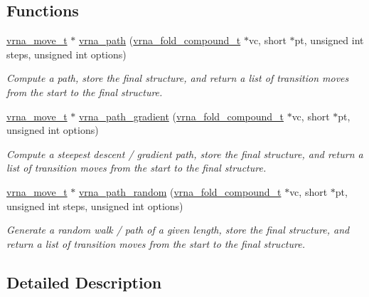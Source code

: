 \subsection*{Functions}
\begin{DoxyCompactItemize}
\item 
\hyperlink{group__neighbors_structvrna__move__s}{vrna\+\_\+move\+\_\+t} $\ast$ \hyperlink{group__paths_ga327c96463d698e7863508499cacce9ab}{vrna\+\_\+path} (\hyperlink{group__fold__compound_ga1b0cef17fd40466cef5968eaeeff6166}{vrna\+\_\+fold\+\_\+compound\+\_\+t} $\ast$vc, short $\ast$pt, unsigned int steps, unsigned int options)
\begin{DoxyCompactList}\small\item\em Compute a path, store the final structure, and return a list of transition moves from the start to the final structure. \end{DoxyCompactList}\item 
\hyperlink{group__neighbors_structvrna__move__s}{vrna\+\_\+move\+\_\+t} $\ast$ \hyperlink{group__paths_gafa18d5153ee540ddd9b93aba59d26184}{vrna\+\_\+path\+\_\+gradient} (\hyperlink{group__fold__compound_ga1b0cef17fd40466cef5968eaeeff6166}{vrna\+\_\+fold\+\_\+compound\+\_\+t} $\ast$vc, short $\ast$pt, unsigned int options)
\begin{DoxyCompactList}\small\item\em Compute a steepest descent / gradient path, store the final structure, and return a list of transition moves from the start to the final structure. \end{DoxyCompactList}\item 
\hyperlink{group__neighbors_structvrna__move__s}{vrna\+\_\+move\+\_\+t} $\ast$ \hyperlink{group__paths_ga49cfe462288be44e0dd88c96da79acbf}{vrna\+\_\+path\+\_\+random} (\hyperlink{group__fold__compound_ga1b0cef17fd40466cef5968eaeeff6166}{vrna\+\_\+fold\+\_\+compound\+\_\+t} $\ast$vc, short $\ast$pt, unsigned int steps, unsigned int options)
\begin{DoxyCompactList}\small\item\em Generate a random walk / path of a given length, store the final structure, and return a list of transition moves from the start to the final structure. \end{DoxyCompactList}\end{DoxyCompactItemize}


\subsection{Detailed Description}


